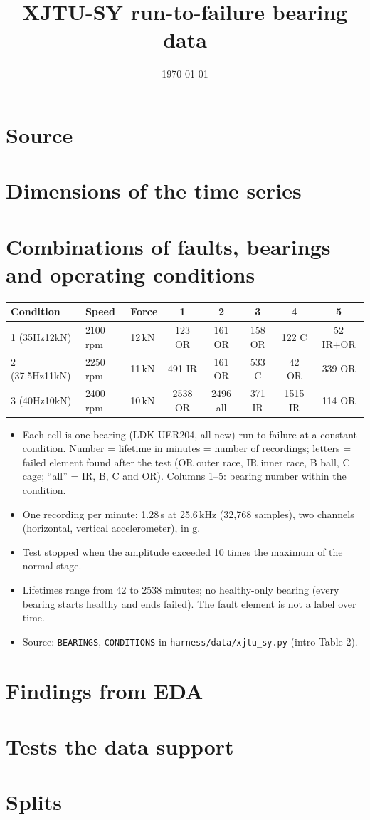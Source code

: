 \documentclass[11pt,a4paper]{article}
\title{XJTU-SY run-to-failure bearing data}
\author{}
\date{\today}
\begin{document}
\maketitle

\section{Source}

\section{Dimensions of the time series}

\section{Combinations of faults, bearings and operating conditions}

\begin{table}[h]
\centering
\small
\begin{tabular}{lll ccccc}
\toprule
Condition & Speed & Force & 1 & 2 & 3 & 4 & 5 \\
\midrule
1 (35Hz12kN)   & 2100\,rpm & 12\,kN & 123 OR  & 161 OR & 158 OR & 122 C   & 52 IR+OR \\
2 (37.5Hz11kN) & 2250\,rpm & 11\,kN & 491 IR  & 161 OR & 533 C  & 42 OR   & 339 OR \\
3 (40Hz10kN)   & 2400\,rpm & 10\,kN & 2538 OR & 2496 all & 371 IR & 1515 IR & 114 OR \\
\bottomrule
\end{tabular}
\end{table}

\begin{itemize}
  \item Each cell is one bearing (LDK UER204, all new) run to failure at a constant condition.
        Number = lifetime in minutes = number of recordings; letters = failed element found
        after the test (OR outer race, IR inner race, B ball, C cage; ``all'' = IR, B, C and OR).
        Columns 1--5: bearing number within the condition.
  \item One recording per minute: 1.28\,s at 25.6\,kHz (32,768 samples), two channels
        (horizontal, vertical accelerometer), in g.
  \item Test stopped when the amplitude exceeded 10 times the maximum of the normal stage.
  \item Lifetimes range from 42 to 2538 minutes; no healthy-only bearing (every bearing
        starts healthy and ends failed). The fault element is not a label over time.
  \item Source: \texttt{BEARINGS}, \texttt{CONDITIONS} in \texttt{harness/data/xjtu\_sy.py}
        (intro Table 2).
\end{itemize}

\section{Findings from EDA}

\section{Tests the data support}

\section{Splits}
\end{document}
